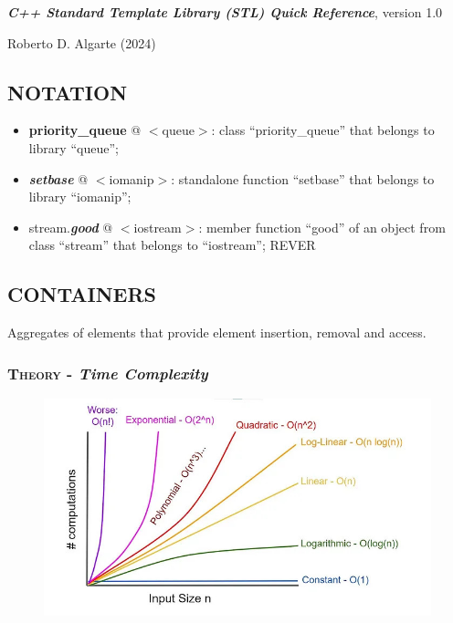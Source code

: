 \documentclass[10pt]{article}
\begin{document}
\noindent
{\Large{\textbf{\emph{C++ Standard Template Library (STL) Quick Reference}}, {\small version 1.0}}	
}

\noindent
{\small  Roberto D. Algarte (2024)}

\scriptsize
\begin{multicols*}{5}

{\color{Blue}
\subsection*{NOTATION}	

\begin{itemize}[leftmargin=*,topsep=0.25pt]
  \setlength\itemsep{-1.8pt}
	\item \textbf{priority\_queue} @ $<$queue$>$: class ``pri\-ori\-ty\_que\-ue'' that belongs to library ``queue'';
	\item \emph{\textbf{setbase}} @ $<$iomanip$>$: standalone function ``setbase'' that belongs to library ``iomanip'';
	\item stream.\emph{\textbf{good}} @ $<$iostream$>$: member function ``good'' of an object from class ``stream'' that belongs to ``iostream''; REVER
\end{itemize}

}

{\color{Blue}
\subsection*{CONTAINERS}	
\noindent
Aggregates of elements that provide element insertion, removal and access.

\subsubsection*{\textsc{Theory} - \emph{Time Complexity}} 
\begin{figure}[H]
\begin{center}
\includegraphics[scale=.21]{complexity.jpg}	
\end{center}
\end{figure}

}
\end{multicols*}
\end{document}
